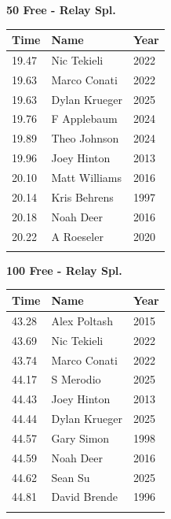 \vspace{1.2em}
\noindent\begin{minipage}[t]{0.48\textwidth}
\centering
\textbf{\textcolor{teamprimary}{50 Free - Relay Spl.}}\par
\vspace{0.5em}
\centering
\small
\renewcommand{\arraystretch}{1.0}
\setlength{\tabcolsep}{4pt}
\begin{tabular}{@{}p{1.8cm}p{3.0cm}p{1.0cm}@{}}
\toprule
\textbf{Time} & \textbf{Name} & \textbf{Year} \\
\midrule
19.47 & Nic Tekieli & 2022 \\
19.63 & Marco Conati & 2022 \\
19.63 & Dylan Krueger & 2025 \\
19.76 & F Applebaum & 2024 \\
19.89 & Theo Johnson & 2024 \\
19.96 & Joey Hinton & 2013 \\
20.10 & Matt Williams & 2016 \\
20.14 & Kris Behrens & 1997 \\
20.18 & Noah Deer & 2016 \\
20.22 & A Roeseler & 2020 \\
\bottomrule
\vspace{0.5em}
\end{tabular}
\end{minipage}
\hfill
\begin{minipage}[t]{0.48\textwidth}
\centering
\textbf{\textcolor{teamprimary}{100 Free - Relay Spl.}}\par
\vspace{0.5em}
\centering
\small
\renewcommand{\arraystretch}{1.0}
\setlength{\tabcolsep}{4pt}
\begin{tabular}{@{}p{1.8cm}p{3.0cm}p{1.0cm}@{}}
\toprule
\textbf{Time} & \textbf{Name} & \textbf{Year} \\
\midrule
43.28 & Alex Poltash & 2015 \\
43.69 & Nic Tekieli & 2022 \\
43.74 & Marco Conati & 2022 \\
44.17 & S Merodio & 2025 \\
44.43 & Joey Hinton & 2013 \\
44.44 & Dylan Krueger & 2025 \\
44.57 & Gary Simon & 1998 \\
44.59 & Noah Deer & 2016 \\
44.62 & Sean Su & 2025 \\
44.81 & David Brende & 1996 \\
\bottomrule
\vspace{0.5em}
\end{tabular}
\end{minipage}

